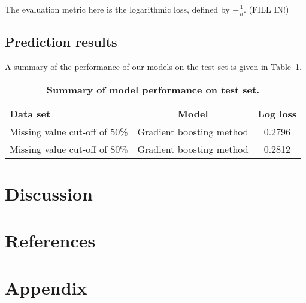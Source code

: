 \documentclass{article}\usepackage[]{graphicx}\usepackage[]{color}
\begin{document}
The evaluation metric here is the logarithmic loss, defined by $-\frac{1}{n}$. (FILL IN!)

\subsection{Prediction results}
A summary of the performance of our models on the test set is given in Table~\ref{tab-results}.

\begin{table}[ht]
  \centering
  \begin{tabular}{@{}|l|c|c|@{}}
    \hline
  	Data set & Model & Log loss\\ 
		\hline
  	Missing value cut-off of 50\% & Gradient boosting method & 0.2796 \\ 
    Missing value cut-off of 80\% & Gradient boosting method & 0.2812 \\
  	\hline
	\end{tabular}
	\caption{\textbf{Summary of model performance on test set.}}
  \label{tab-results}
\end{table}
\section{Discussion} 
\label{sec:discussion}
\section{References}
\clearpage
\appendix
\section*{Appendix}
\label{sec:appendix}
\end{document}
